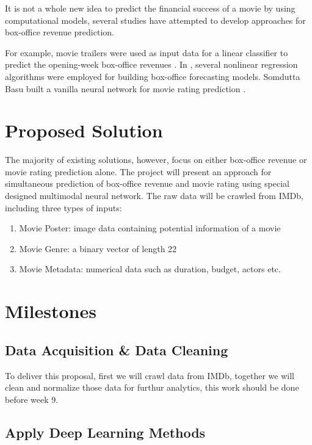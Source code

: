 \documentclass[conference]{IEEEtran}
\begin{document}
It is not a whole new idea to predict the financial success of a movie by using computational models, several studies have attempted to develop approaches for box-office revenue prediction.

For example, movie trailers were used as input data for a linear classifier to predict the opening-week box-office revenues \cite{trailer}. In \cite{boxoffice}, several nonlinear regression algorithms were employed for building box-office forecasting models. Somdutta Basu built a vanilla neural network for movie rating prediction \cite{rating}.

\section{Proposed Solution}

The majority of existing solutions, however, focus on either box-office revenue or movie rating prediction alone. The project will present an approach for simultaneous prediction of box-office revenue and movie rating using special designed multimodal neural network. The raw data will be crawled from IMDb, including three types of inputs:

\begin{enumerate}
  \item Movie Poster: image data containing potential information of a movie
  \item Movie Genre: a binary vector of length 22
  \item Movie Metadata: numerical data such as duration, budget, actors etc.
\end{enumerate}

\section{Milestones}

\subsection{Data Acquisition \& Data Cleaning}

To deliver this proposal, first we will crawl data from IMDb, together we will clean and normalize those data for furthur analytics, this work should be done before week 9.

\subsection{Apply Deep Learning Methods}
\end{document}
